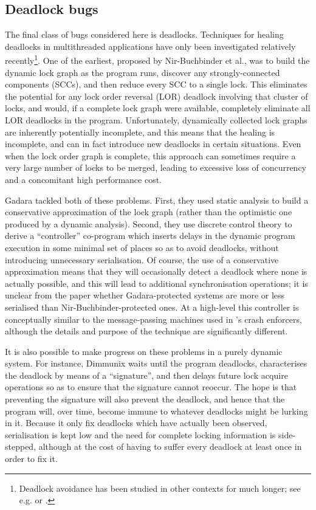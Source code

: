\subsection{Deadlock bugs}
The final class of bugs considered here is deadlocks.  Techniques for
healing deadlocks in multithreaded applications have only been
investigated relatively recently\footnote{Deadlock avoidance has been
  studied in other contexts for much longer; see
  e.g. \cite{Dijkstra2004} or \cite{Viswanadham1990}.}.  One of the
earliest, proposed by Nir-Buchbinder et al.\cite{Nir-Buchbinder2008},
was to build the dynamic lock graph as the program runs, discover any
strongly-connected components (SCCs), and then reduce every SCC to a
single lock.  This eliminates the potential for any lock order
reversal (LOR) deadlock involving that cluster of locks, and would, if
a complete lock graph were available, completely eliminate all LOR
deadlocks in the program.  Unfortunately, dynamically collected lock
graphs are inherently potentially incomplete, and this means that the
healing is incomplete, and can in fact introduce new deadlocks in
certain situations.  Even when the lock order graph is complete, this
approach can sometimes require a very large number of locks to be
merged, leading to excessive loss of concurrency and a concomitant
high performance cost.

Gadara\cite{Wang2008} tackled both of these problems.  First, they
used static analysis to build a conservative approximation of the lock
graph (rather than the optimistic one produced by a dynamic analysis).
Second, they use discrete control theory to derive a ``controller''
co-program which inserts delays in the dynamic program execution in
some minimal set of places so as to avoid deadlocks, without
introducing unnecessary serialisation.  Of course, the use of a
conservative approximation means that they will occasionally detect a
deadlock where none is actually possible, and this will lead to
additional synchronisation operations; it is unclear from the paper
whether Gadara-protected systems are more or less serialised than
Nir-Buchbinder-protected ones.  At a high-level this controller is
conceptually similar to the message-passing machines used in
{\technique}'s crash enforcers, although the details and purpose of
the technique are significantly different.

It is also possible to make progress on these problems in a purely
dynamic system.  For instance, Dimmunix\cite{Jula2008} waits until the
program deadlocks, characterises the deadlock by means of a
``signature'', and then delays future lock acquire operations so as to
ensure that the signature cannot reoccur.  The hope is that preventing
the signature will also prevent the deadlock, and hence that the
program will, over time, become immune to whatever deadlocks might be
lurking in it.  Because it only fix deadlocks which have actually been
observed, serialisation is kept low and the need for complete locking
information is side-stepped, although at the cost of having to suffer
every deadlock at least once in order to fix it.

